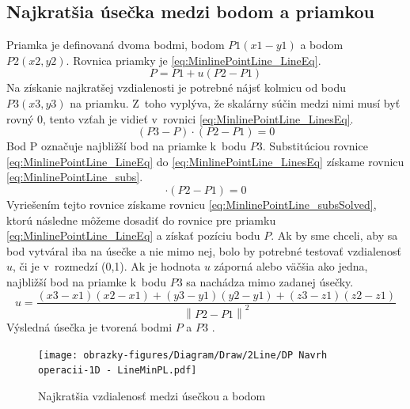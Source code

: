 \subsection*{Najkratšia úsečka medzi bodom a priamkou}\label{sec:najkratsiauseckaBP}
Priamka je definovaná dvoma bodmi, bodom $P1(x1-y1)$ a bodom $P2(x2,y2)$. 
Rovnica priamky je \ref{eq:MinlinePointLine_LineEq}.
\begin{equation}
    P = P1 + u(P2-P1)
    \label{eq:MinlinePointLine_LineEq}
\end{equation}
Na získanie najkratšej vzdialenosti je potrebné nájsť kolmicu od bodu $P3(x3,y3)$ na priamku. Z~toho vyplýva, že skalárny súčin medzi nimi musí byť rovný 0, tento vzťah je vidieť v~rovnici \ref{eq:MinlinePointLine_LinesEq}.
\begin{equation}
    (P3-P)\cdot(P2-P1) =0 
    \label{eq:MinlinePointLine_LinesEq}
\end{equation}
Bod P označuje najbližší bod na priamke k~bodu $P3$.
Substitúciou rovnice \ref{eq:MinlinePointLine_LineEq} do \ref{eq:MinlinePointLine_LinesEq} získame rovnicu \ref{eq:MinlinePointLine_subs}.
\begin{equation}
[P3 - P1 - u(P2-P1)] \cdot (P2 - P1) = 0
    \label{eq:MinlinePointLine_subs}
\end{equation}
Vyriešením tejto rovnice získame rovnicu \ref{eq:MinlinePointLine_subsSolved}, ktorú následne môžeme dosadiť do rovnice pre priamku \ref{eq:MinlinePointLine_LineEq} a získať pozíciu bodu $P$. Ak by sme chceli, aby sa bod vytváral iba na úsečke a nie mimo nej, bolo by potrebné testovať vzdialenosť $u$, či je v~rozmedzí (0,1). Ak je hodnota $u$ záporná alebo väčšia ako jedna,  najbližší bod na priamke k~bodu $P3$ sa nachádza mimo zadanej úsečky. 
\begin{equation}
u= \frac
{\left (x3 -x1  \right )\left (x2-x1  \right )
+\left (y3-y1  \right )\left (y2-y1  \right )
+\left (z3-z1  \right )\left (z2-z1  \right )}
{\left \| P2-P1 \right \|^{2}}
    \label{eq:MinlinePointLine_subsSolved}
\end{equation}
Výsledná úsečka je tvorená bodmi $P$ a $P3$ \cite{bourke_Point_Line_Plane}.



\begin{figure}[H]
	\centering
	\texttt{[image: obrazky-figures/Diagram/Draw/2Line/DP Navrh operacii-1D -  LineMinPL.pdf]}
	\caption{Najkratšia vzdialenosť medzi úsečkou a bodom}
	\label{fig:LineMinPL}
\end{figure}


